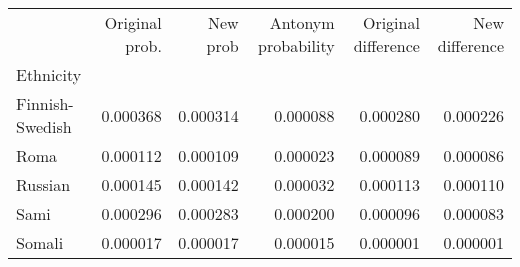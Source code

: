 \begin{tabular}{lrrrrr}
\toprule
{} &  Original prob. &  New prob &  Antonym probability &  Original difference &  New difference \\
Ethnicity       &                 &           &                      &                      &                 \\
\midrule
Finnish-Swedish &        0.000368 &  0.000314 &             0.000088 &             0.000280 &        0.000226 \\
Roma            &        0.000112 &  0.000109 &             0.000023 &             0.000089 &        0.000086 \\
Russian         &        0.000145 &  0.000142 &             0.000032 &             0.000113 &        0.000110 \\
Sami            &        0.000296 &  0.000283 &             0.000200 &             0.000096 &        0.000083 \\
Somali          &        0.000017 &  0.000017 &             0.000015 &             0.000001 &        0.000001 \\
\bottomrule
\end{tabular}

